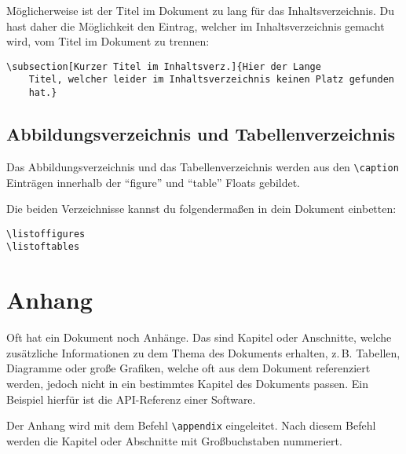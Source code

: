 Möglicherweise ist der Titel im Dokument zu lang für das Inhaltsverzeichnis. Du hast daher die Möglichkeit den Eintrag, welcher im Inhaltsverzeichnis gemacht wird, vom Titel im Dokument zu trennen:

\begin{lstlisting}
\subsection[Kurzer Titel im Inhaltsverz.]{Hier der Lange
	Titel, welcher leider im Inhaltsverzeichnis keinen Platz gefunden
	hat.}
\end{lstlisting}
 

\subsection{Abbildungsverzeichnis und Tabellenverzeichnis}

Das Abbildungsverzeichnis und das Tabellenverzeichnis werden aus den \texttt{\textbackslash caption} Einträgen innerhalb der \enquote{figure} und \enquote{table} Floats gebildet. 

Die beiden Verzeichnisse kannst du folgendermaßen in dein Dokument einbetten:

\begin{lstlisting}
\listoffigures
\listoftables
\end{lstlisting}


\section{Anhang}

Oft hat ein Dokument noch Anhänge. Das sind Kapitel oder Anschnitte, welche zusätzliche Informationen zu dem Thema des Dokuments erhalten, z.\,B. Tabellen, Diagramme oder große Grafiken, welche oft aus dem Dokument referenziert werden, jedoch nicht in ein bestimmtes Kapitel des Dokuments passen. Ein Beispiel hierfür ist die API-Referenz einer Software.

Der Anhang wird mit dem Befehl \texttt{\textbackslash appendix} eingeleitet. Nach diesem Befehl werden die Kapitel oder Abschnitte mit Großbuchstaben nummeriert.

